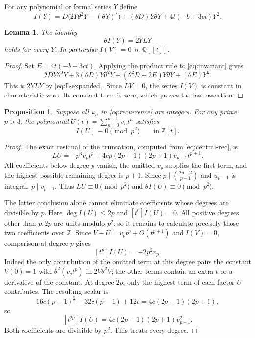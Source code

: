\documentclass[11pt,a4paper]{article}
\newtheorem{proposition}[theorem]{Proposition}
\newtheorem{lemma}[theorem]{Lemma}
\theoremstyle{remark}\newtheorem{remark}[theorem]{Remark}
\newcommand{\Z}{\mathbb Z}\newcommand{\Q}{\mathbb Q}
\begin{document}
For any polynomial or formal series $Y$ define
\begin{equation}\label{eq:invariant}
 I(Y)=D\bigl(2Y\theta^2Y-(\theta Y)^2\bigr)
       +(\theta D)Y\theta Y+4t(-b+3ct)Y^2.
\end{equation}
\begin{lemma}\label{lem:differential}
The identity
\begin{equation}\label{eq:Leibniz}
 \theta I(Y)=2YLY
\end{equation}
holds for every $Y$. In particular $I(V)=0$ in $\Q[[t]]$.
\end{lemma}
\begin{proof}
Set $E=4t(-b+3ct)$. Applying the product rule to \eqref{eq:invariant}
gives
\[
 2DY\theta^3Y+3(\theta D)Y\theta^2Y
 +(\theta^2D+2E)Y\theta Y+(\theta E)Y^2.
\]
This is $2YLY$ by \eqref{eq:L-expanded}. Since $LV=0$, the series $I(V)$
is constant in characteristic zero. Its constant term is zero, which proves
the last assertion.
\end{proof}

\begin{proposition}\label{prop:finite-invariant}
Suppose all $u_n$ in \eqref{eq:recurrence} are integers. For any prime
$p>3$, the polynomial $U(t)=\sum_{n=0}^{p-1}v_nt^n$ satisfies
\begin{equation}\label{eq:finite-invariant}
 I(U)\equiv0\pmod{p^2}\qquad\text{in }\Z[t].
\end{equation}
\end{proposition}
\begin{proof}
The exact residual of the truncation, computed from \eqref{eq:central-rec}, is
\begin{equation}\label{eq:LU}
 LU=-p^3v_pt^p+4cp(2p-1)(2p+1)v_{p-1}t^{p+1}.
\end{equation}
All coefficients below degree $p$ vanish, the omitted $v_p$ supplies the
first term, and the highest possible remaining degree is $p+1$.
Since $p\mid\binom{2p-2}{p-1}$ and $u_{p-1}$ is integral,
$p\mid v_{p-1}$. Thus $LU\equiv0\pmod{p^2}$ and
$\theta I(U)\equiv0\pmod{p^2}$.

The latter conclusion alone cannot eliminate coefficients whose degrees
are divisible by $p$. Here $\deg I(U)\le2p$ and $[t^0]I(U)=0$.
All positive degrees other than $p,2p$ are units modulo $p^2$, so it remains
to calculate precisely those two coefficients over $\Z$.
Since $V-U=v_pt^p+O(t^{p+1})$ and $I(V)=0$, comparison at degree $p$
gives
\begin{equation}\label{eq:resonance-p}
 [t^p]I(U)=-2p^2v_p.
\end{equation}
Indeed the only contribution of the omitted term at this degree pairs
the constant $V(0)=1$ with $\theta^2(v_pt^p)$ in $2V\theta^2V$;
the other terms contain an extra $t$ or a derivative of the constant.
At degree $2p$, only the highest term of each factor $U$ contributes.
The resulting scalar is
\[
 16c(p-1)^2+32c(p-1)+12c=4c(2p-1)(2p+1),
\]
so
\begin{equation}\label{eq:resonance-2p}
 [t^{2p}]I(U)=4c(2p-1)(2p+1)v_{p-1}^2.
\end{equation}
Both coefficients are divisible by $p^2$. This treats every degree.
\end{proof}
\end{document}
